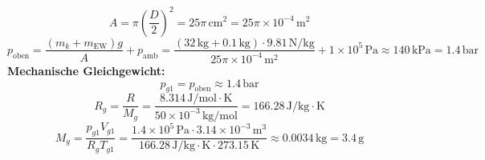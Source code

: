 

\item[a)]
    \[
    A = \pi \left( \frac{D}{2} \right)^2 = 25 \pi \, \text{cm}^2 = 25 \pi \times 10^{-4} \, \text{m}^2
    \]
    \[
    p_{\text{oben}} = \frac{(m_k + m_{\text{EW}}) g}{A} + p_{\text{amb}} = \frac{(32 \, \text{kg} + 0.1 \, \text{kg}) \cdot 9.81 \, \text{N/kg}}{25 \pi \times 10^{-4} \, \text{m}^2} + 1 \times 10^5 \, \text{Pa} \approx 140 \, \text{kPa} = 1.4 \, \text{bar}
    \]
    \textbf{Mechanische Gleichgewicht:}
    \[
    p_{g1} = p_{\text{oben}} \approx 1.4 \, \text{bar}
    \]
    \[
    R_g = \frac{R}{M_g} = \frac{8.314 \, \text{J/mol} \cdot \text{K}}{50 \times 10^{-3} \, \text{kg/mol}} = 166.28 \, \text{J/kg} \cdot \text{K}
    \]
    \[
    M_g = \frac{p_{g1} V_{g1}}{R_g T_{g1}} = \frac{1.4 \times 10^5 \, \text{Pa} \cdot 3.14 \times 10^{-3} \, \text{m}^3}{166.28 \, \text{J/kg} \cdot \text{K} \cdot 273.15 \, \text{K}} \approx 0.0034 \, \text{kg} = 3.4 \, \text{g}
    \]
